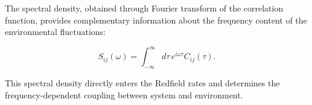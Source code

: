 The spectral density, obtained through Fourier transform of the correlation function, provides complementary information about the frequency content of the environmental fluctuations:

\begin{equation}
    S_{ij}(\omega) = \int_{-\infty}^{\infty} d\tau \, e^{i\omega\tau} C_{ij}(\tau).
    \label{eq:spectral_density}
\end{equation}

This spectral density directly enters the Redfield rates and determines the frequency-dependent coupling between system and environment.

